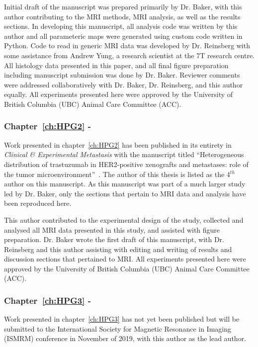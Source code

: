 Initial draft of the manuscript was prepared primarily by Dr. Baker, with this author contributing to the MRI methods, MRI analysis, as well as the results sections. 
In developing this manuscript, all analysis code was written by this author and all parameteric maps were generated using custom code written in Python.
Code to read in generic MRI data was developed by Dr. Reinsberg with some assistance from Andrew Yung, a research scientist at the 7T research centre.
All histology data presented in this paper, and all final figure preparation  including manuscript submission was done by Dr. Baker.
Reviewer comments were addressed collaboratively with Dr. Baker, Dr. Reinsberg, and this author equally.
All experiments presented here were approved by the University of British Columbia (UBC) Animal Care Committee (ACC).

\subsubsection{Chapter~\ref{ch:HPG2} - }

Work presented in chapter~\ref{ch:HPG2} has been published in its entirety in \emph{Clinical \& Experimental Metastasis} with the manuscript titled ``Heterogeneous distribution of trastuzumab in HER2-positive xenografts and metastases: role of the tumor microenvironment''~\cite{Baker:2018ex}.
The author of this thesis is listed as the 4$^{th}$ author on this manuscript.
As this manuscript was part of a much larger study led by Dr. Baker, only the sections that pertain to MRI data and analysis have been reproduced here.

This author contributed to the experimental design of the study, collected and analysed all MRI data presented in this study, and assisted with figure preparation.
Dr. Baker wrote the first draft of this manuscript, with Dr. Reinsberg and this author assisting with editing and writing of results and discussion sections that pertained to MRI.
All experiments presented here were approved by the University of British Columbia (UBC) Animal Care Committee (ACC).

\subsubsection{Chapter~\ref{ch:HPG3} - }

Work presented in chapter~\ref{ch:HPG3} has not yet been published but will be submitted to the International Society for Magnetic Resonance in Imaging (ISMRM) conference in November of 2019, with this author as the lead author.


